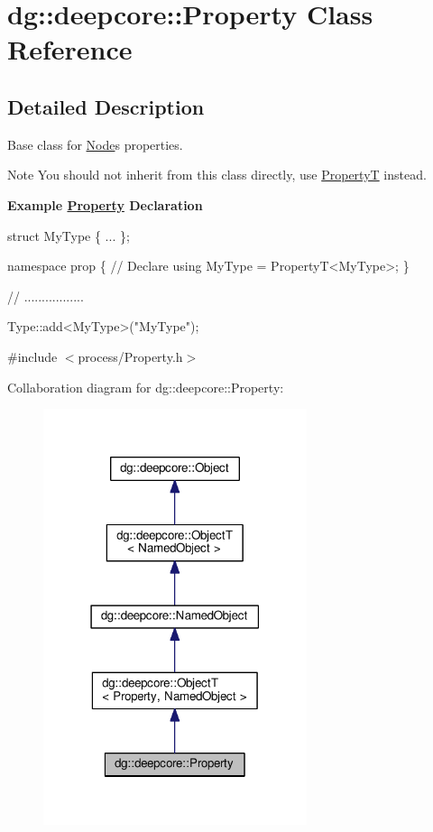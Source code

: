 \hypertarget{classdg_1_1deepcore_1_1_property}{}\section{dg\+:\+:deepcore\+:\+:Property Class Reference}
\label{classdg_1_1deepcore_1_1_property}


\subsection{Detailed Description}
Base class for \hyperlink{classdg_1_1deepcore_1_1_node}{Node}\textquotesingle{}s properties. 

\begin{DoxyNote}{Note}
You should not inherit from this class directly, use \hyperlink{structdg_1_1deepcore_1_1_property_t}{PropertyT} instead.
\end{DoxyNote}
{\bfseries Example \hyperlink{classdg_1_1deepcore_1_1_property}{Property} Declaration} 
\begin{DoxyCode}
\textcolor{keyword}{struct }MyType \{ ... \};

\textcolor{keyword}{namespace }prop \{
    \textcolor{comment}{// Declare}
    \textcolor{keyword}{using} MyType = PropertyT<MyType>;
\}

\textcolor{comment}{// .................}

Type::add<MyType>(\textcolor{stringliteral}{"MyType"});
\end{DoxyCode}
 

{\ttfamily \#include $<$process/\+Property.\+h$>$}



Collaboration diagram for dg\+:\+:deepcore\+:\+:Property\+:
\nopagebreak
\begin{figure}[H]
\begin{center}
\leavevmode
\includegraphics[width=219pt]{classdg_1_1deepcore_1_1_property__coll__graph}
\end{center}
\end{figure}
